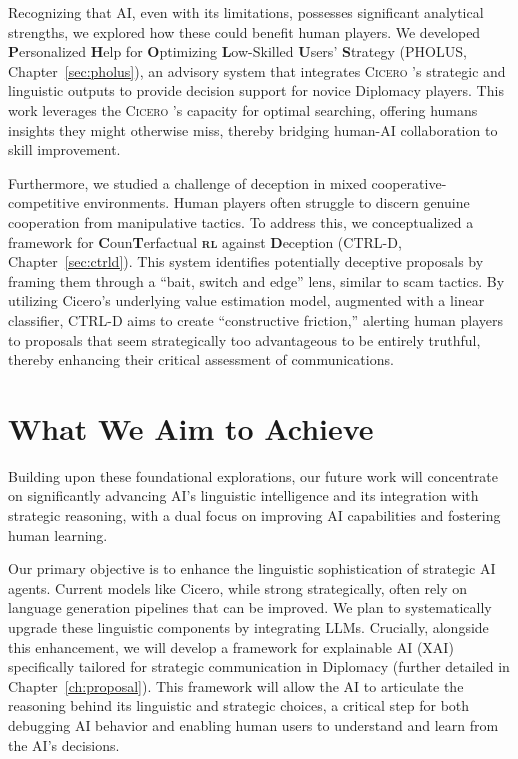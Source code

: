 \documentclass[oneside]{memoir}
\newcommand{\cicero}{\abr{Cicero} }
\newcommand{\abr}[1]{\textsc{#1}}
\begin{document}
Recognizing that AI, even with its limitations, possesses significant analytical strengths, we explored how these could benefit human players. We developed \textbf{P}ersonalized \textbf{H}elp for \textbf{O}ptimizing \textbf{L}ow-Skilled \textbf{U}sers’ \textbf{S}trategy (PHOLUS, Chapter~\ref{sec:pholus}), an advisory system that integrates 
\cicero's strategic and linguistic outputs to provide decision support for novice Diplomacy players. This work leverages the \cicero's capacity for optimal searching, offering humans insights they might otherwise miss, thereby bridging human-AI collaboration to skill improvement.

Furthermore, we studied a challenge of deception in mixed cooperative-competitive environments. Human players often struggle to discern genuine cooperation from manipulative tactics. To address this, we conceptualized a framework for \textbf{C}oun\textbf{T}erfactual \textbf{\abr{rl}} against \textbf{D}eception (CTRL-D, Chapter~\ref{sec:ctrld}). This system identifies potentially deceptive proposals by framing them through a ``bait, switch and edge'' lens, similar to scam tactics. By utilizing Cicero's underlying value estimation model, augmented with a linear classifier, CTRL-D aims to create ``constructive friction,'' alerting human players to proposals that seem strategically too advantageous to be entirely truthful, thereby enhancing their critical assessment of communications. 

\section{What We Aim to Achieve}
Building upon these foundational explorations, our future work will concentrate on significantly advancing AI's linguistic intelligence and its integration with strategic reasoning, with a dual focus on improving AI capabilities and fostering human learning.

Our primary objective is to enhance the linguistic sophistication of strategic AI agents. Current models like Cicero, while strong strategically, often rely on language generation pipelines that can be improved. We plan to systematically upgrade these linguistic components by integrating LLMs. Crucially, alongside this enhancement, we will develop a framework for explainable AI (XAI) specifically tailored for strategic communication in Diplomacy (further detailed in Chapter~\ref{ch:proposal}). This framework will allow the AI to articulate the reasoning behind its linguistic and strategic choices, a critical step for both debugging AI behavior and enabling human users to understand and learn from the AI's decisions.
\end{document}

